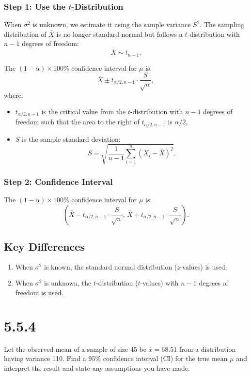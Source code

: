 \documentclass{article}
\begin{document}
\subsubsection*{Step 1: Use the $t$-Distribution}
When $\sigma^2$ is unknown, we estimate it using the sample variance $S^2$. The sampling distribution of $\bar{X}$ is no longer standard normal but follows a $t$-distribution with $n-1$ degrees of freedom:
\[
\bar{X} \sim t_{n-1}.
\]

The $(1 - \alpha) \times 100\%$ confidence interval for $\mu$ is:
\[
\bar{X} \pm t_{\alpha/2, n-1} \cdot \frac{S}{\sqrt{n}},
\]
where:
\begin{itemize}
    \item $t_{\alpha/2, n-1}$ is the critical value from the $t$-distribution with $n-1$ degrees of freedom such that the area to the right of $t_{\alpha/2, n-1}$ is $\alpha/2$,
    \item $S$ is the sample standard deviation:
    \[
    S = \sqrt{\frac{1}{n-1} \sum_{i=1}^n (X_i - \bar{X})^2}.
    \]
\end{itemize}

\subsubsection*{Step 2: Confidence Interval}
The $(1 - \alpha) \times 100\%$ confidence interval for $\mu$ is:
\[
\left( \bar{X} - t_{\alpha/2, n-1} \cdot \frac{S}{\sqrt{n}}, \, \bar{X} + t_{\alpha/2, n-1} \cdot \frac{S}{\sqrt{n}} \right).
\]

\subsection*{Key Differences}
\begin{enumerate}
    \item When $\sigma^2$ is known, the standard normal distribution ($z$-values) is used.
    \item When $\sigma^2$ is unknown, the $t$-distribution ($t$-values) with $n-1$ degrees of freedom is used.
\end{enumerate}

\section*{5.5.4}

Let the observed mean of a sample of size 45 be $\bar{x} = 68.51$ from a distribution having variance 110. Find a 95\% confidence interval (CI) for the true mean $\mu$ and interpret the result and state any assumptions you have made.
\end{document}
